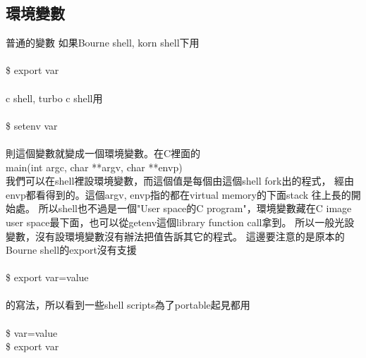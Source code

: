     \subsection{環境變數}
    普通的變數 如果Bourne shell, korn shell下用 \\\\
    \$ export var \\\\
    c shell, turbo c shell用 \\\\
    \$ setenv var \\\\
    則這個變數就變成一個環境變數。在C裡面的\\

    main(int argc, char **argv, char **envp)\\ 

    我們可以在shell裡設環境變數，而這個值是每個由這個shell fork出的程式，
    經由envp都看得到的。這個argv, envp指的都在virtual memory的下面stack
    往上長的開始處。
    所以shell也不過是一個"User space的C program"，環境變數藏在C image user 
    space最下面，也可以從getenv這個library function call拿到。
    所以一般光設變數，沒有設環境變數沒有辦法把值告訴其它的程式。
    這邊要注意的是原本的Bourne shell的export沒有支援\\\\
    \$ export var=value\\\\
    的寫法，所以看到一些shell scripts為了portable起見都用\\\\
    \$ var=value \\
    \$ export var \\
